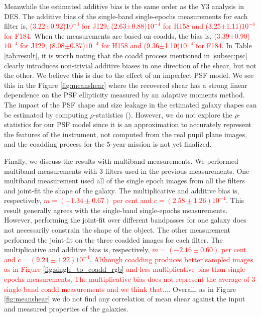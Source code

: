 {Meanwhile the estimated additive bias is the same order as the Y3 analysis in DES. The additive bias of the single-band single-epochs measurements for each filter is, \textcolor{red}{(3.22$\pm$0.92)$10^{-4}$ for J129, (2.63$\pm$0.88)$10^{-4}$ for H158 and (3.25$\pm$1.11)$10^{-4}$ for F184}. When the measurements are based on coadds, the bias is, \textcolor{red}{(3.39$\pm$0.90)$10^{-4}$ for J129, (8.08$\pm$0.87)$10^{-4}$ for H158 and (9.36$\pm$1.10)$10^{-4}$ for F184}. In Table \ref{tab:result}, it is worth noting that the coadd process mentioned in \ref{subsec:psc} clearly introduces non-trivial additive biases in one direction of the shear, but not the other. We believe this is due to the effect of an imperfect PSF model. We see this in the Figure \ref{fig:meanshear} where the recovered shear has a strong linear dependence on the PSF ellipticity measured by an adaptive moments method. The impact of the PSF shape and size leakage in the estimated galaxy shapes can be estimated by computing $\rho$-statistics (\citealt{2008A&A...484...67P, 2010MNRAS.404..350R, 2016MNRAS.460.2245J}). However, we do not explore the $\rho$-statistics for our PSF model since it is an approximation to accurately represent the features of the instrument, not computed from the real pupil plane images, and the coadding process for the 5-year mission is not yet finalized. 


Finally, we discuss the results with multiband measurements. We performed multiband measurements with 3 filters used in the previous measurements. One multiband measurement used all of the single epoch images from all the filters and joint-fit the shape of the galaxy. The multiplicative and additive bias is, respectively, \textcolor{red}{$m=(-1.34\pm0.67)$ per cent and $c=(2.58\pm1.26)10^{-4}$}. This result generally agrees with the single-band single-epochs measurements. However, performing the joint-fit over different bandpasses for one galaxy does not necessarily constrain the shape of the object. The other measurement performed the joint-fit on the three coadded images for each filter. The multiplicative and additive bias is, respectively, \textcolor{red}{$m=(-2.16\pm0.60)$ per cent and $c=(9.24\pm1.22)10^{-4}$}. \textcolor{red}{Although coadding produces better sampled images as in Figure \ref{fig:single_to_coadd_rgb} and less multiplicative bias than single-epochs measurements, The multiplicative bias does not represent the average of 3 single-band coadd measurements and we think that...}. Overall, as in Figure \ref{fig:meanshear} we do not find any correlation of mean shear against the input and measured properties of the galaxies.


}
